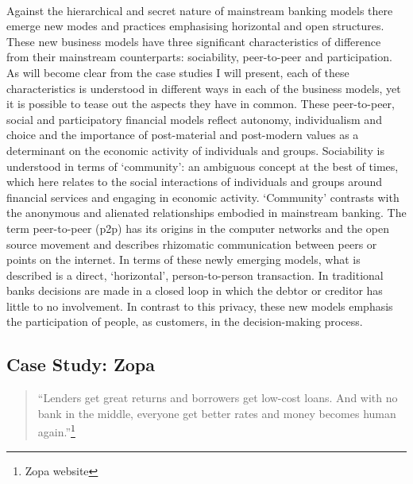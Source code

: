 \documentclass[12pt,a4paper,titlepage]{article}
\begin{document}
\paragraph{}Against the hierarchical and secret nature of mainstream banking models there emerge new modes and practices emphasising horizontal and open structures. These new business models have three significant characteristics of difference from their mainstream counterparts: sociability, peer-to-peer and participation. As will become clear from the case studies I will present, each of these characteristics is understood in different ways in each of the business models, yet it is possible to tease out the aspects they have in common. These peer-to-peer, social and participatory financial models reflect autonomy, individualism and choice and the importance of post-material and post-modern values as a determinant on the economic activity of individuals and groups. Sociability is understood in terms of `community': an ambiguous concept at the best of times, which here relates to the social interactions of individuals and groups around financial services and engaging in economic activity. `Community' contrasts with the anonymous and alienated relationships embodied in mainstream banking. The term peer-to-peer (p2p) has its origins in the computer networks and the open source movement and describes rhizomatic communication between peers or points on the internet. In terms of these newly emerging models, what is described is a direct, `horizontal', person-to-person transaction. In traditional banks decisions are made in a closed loop in which the debtor or creditor has little to no involvement. In contrast to this privacy, these new models emphasis the participation of people, as customers, in the decision-making process. 

\newpage
\subsection{Case Study: Zopa}
\singlespacing
\begin{quote}
``Lenders get great returns and borrowers get low-cost loans. And with no bank in the middle, everyone get better rates and money becomes human again.''\footnote{Zopa website}
\end{quote}
\doublespacing
\end{document}
